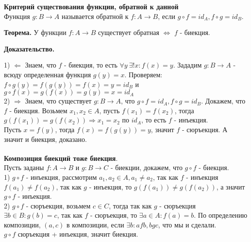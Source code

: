 \textbf{Критерий существования функции, обратной к данной } \\

Функция $g : B \to A$ называется обратной к $f : A \to B$, если $g \circ f = id_A, f \circ g = id_B$. 

\textbf{Теорема.} У функции $f : A \to B$ существует обратная $\Leftrightarrow$ $f$ - биекция.

\textbf{Доказательство.} 

1) $\Leftarrow$ Знаем, что $f$ - биекция, то есть $\forall y\ \exists! x : f(x) = y$. Зададим $g : B \to A$ - всюду определенная функция $g(y) = x$. Проверяем: $f \circ g (y) = f (g(y)) = f(x) = y = id_B$ и $g \circ f(x) = g(f(x)) = g(y) = x = id_A$ \\

2) $\Rightarrow$ Знаем, что существует $g : B \to A$, что $g \circ f = id_A, f \circ g = id_B$. Докажем, что $f$ - биекция. Возьмем $x_1, x_2 \in A$, пусть $f(x_1) = f(x_2)$, тогда $g(f(x_1))  = g(f(x_2)) \Rightarrow x_1 = x_2$ по $id_A$, то есть $f$ - инъекция. \\

Пусть $x = f(y)$, тогда $f(x) = f(g(y)) = y$, значит $f$ - сюръекция. А значит и биекция, доказано.\\ \\


\textbf{Композиция биекций тоже биекция}. \\

Пусть заданы $f : A \to B$ и $g : B \to C$ - биекции, докажем, что $g \circ f$ - биекция. \\

1) $g \circ f$ - инъекция, рассмотрим $a_1, a_2 \in A, a_1 \neq a_2$, так как $f$ - инъекция $f(a_1) \neq f(a_2)$, так как $g$ - инъекция, то $g(f(a_1)) \neq g(f(a_2))$, а значит $g \circ f$ - инъекция. \\

2) $g \circ f$ - сюръекция, возьмем $c \in C$, тогда так как $g$ - сюръекция $\exists b \in B : g(b) = c$, так как $f$ - сюръекция, то $\exists a \in A : f(a) = b$. По определению композиции, $(a, c)$ в композиции, если $\exists b : afb, bgc$, что мы и сделали.\\

$g \circ f$ сюръекция + инъекция, значит биекция. 
